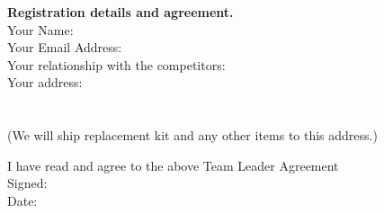 \documentclass[a4paper, 11pt]{scrartcl}
\begin{document}
\appendix



\noindent
\textbf{Registration details and agreement.} \\
\doublespacing
\noindent
Your Name:\hrulefill\\
Your Email Address:\hrulefill\\
Your relationship with the competitors:\hrulefill\\
Your address:\hrulefill\\
\hbox{}\hrulefill\\
\hbox{}\hrulefill\\
(We will ship replacement kit and any other items to this address.)

\noindent
\dotfill\hfill

\noindent
I have read and agree to the above Team Leader Agreement\\
Signed:\hrulefill\\
Date:\hrulefill\\

\singlespacing
\end{document}
